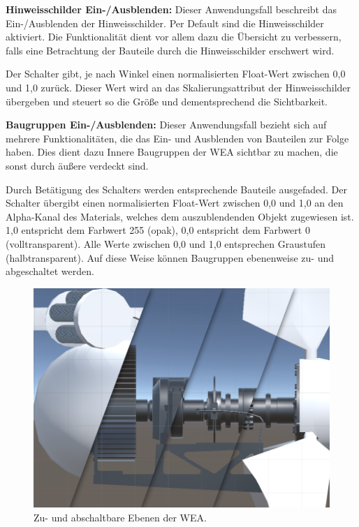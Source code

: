\textbf{Hinweisschilder Ein-/Ausblenden:} Dieser Anwendungsfall beschreibt das  Ein-/Ausblenden der Hinweisschilder. Per Default sind die Hinweisschilder aktiviert. Die Funktionalität dient vor allem dazu die Übersicht zu verbessern, falls eine Betrachtung der Bauteile durch die Hinweisschilder erschwert wird. 

Der Schalter gibt, je nach Winkel einen normalisierten Float-Wert zwischen 0,0 und 1,0 zurück. Dieser Wert wird an das Skalierungsattribut der Hinweisschilder übergeben und steuert so die Größe und dementsprechend die Sichtbarkeit.  

\textbf{Baugruppen Ein-/Ausblenden:} Dieser Anwendungsfall bezieht sich auf mehrere Funktionalitäten, die das Ein- und Ausblenden von Bauteilen zur Folge haben. Dies dient dazu Innere Baugruppen der WEA sichtbar zu machen, die sonst durch äußere verdeckt sind.

Durch Betätigung des Schalters werden entsprechende Bauteile ausgefaded. Der Schalter übergibt einen normalisierten Float-Wert zwischen 0,0 und 1,0 an den Alpha-Kanal des Materials, welches dem auszublendenden Objekt zugewiesen ist. 1,0 entspricht dem Farbwert 255 (opak), 0,0 entspricht dem Farbwert 0 (volltransparent). Alle Werte zwischen 0,0 und 1,0 entsprechen Graustufen (halbtransparent). Auf diese Weise können Baugruppen ebenenweise zu- und abgeschaltet werden. 

\begin{figure}[H]
	\centering
	\captionsetup{width=1\textwidth}
	\includegraphics[keepaspectratio, width=1\textwidth]{bildquellen/baugruppen_klein}
	\caption{Zu- und abschaltbare Ebenen der WEA.}
	\label{fig:4.2}
\end{figure}
\clearpage
